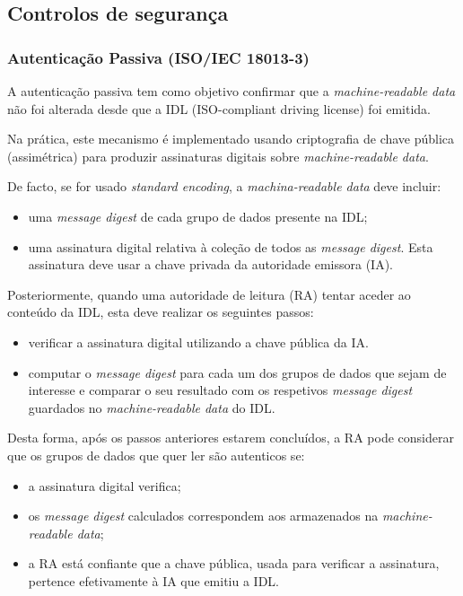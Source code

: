 

\subsection{Controlos de segurança}
\label{sec:orgbc0a271}
\subsubsection{Autenticação Passiva (ISO/IEC 18013-3)}
\label{sec:org479f770}
A autenticação passiva tem como objetivo confirmar que a \emph{machine-readable
data} não foi alterada desde que a IDL (ISO-compliant driving license) foi
emitida.

Na prática, este mecanismo é implementado usando criptografia de chave
pública (assimétrica) para produzir assinaturas digitais sobre
\emph{machine-readable data}.

De facto, se for usado \emph{standard encoding}, a \emph{machina-readable data} deve
incluir:
\begin{itemize}
\item uma \emph{message digest} de cada grupo de dados presente na IDL;
\item uma assinatura digital relativa à coleção de todos as \emph{message digest}. Esta
assinatura deve usar a chave privada da autoridade emissora (IA).
\end{itemize}

Posteriormente, quando uma autoridade de leitura (RA) tentar aceder ao
conteúdo da IDL, esta deve realizar os seguintes passos:
\begin{itemize}
\item verificar a assinatura digital utilizando a chave pública da IA.
\item computar o \emph{message digest} para cada um dos grupos de dados que sejam de
interesse e comparar o seu resultado com os respetivos \emph{message digest}
guardados no \emph{machine-readable data} do IDL.
\end{itemize}

Desta forma, após os passos anteriores estarem concluídos, a RA pode
considerar que os grupos de dados que quer ler são autenticos se:
\begin{itemize}
\item a assinatura digital verifica;
\item os \emph{message digest} calculados correspondem aos armazenados na
\emph{machine-readable data};
\item a RA está confiante que a chave pública, usada para verificar a
assinatura, pertence efetivamente à IA que emitiu a IDL.
\end{itemize}

